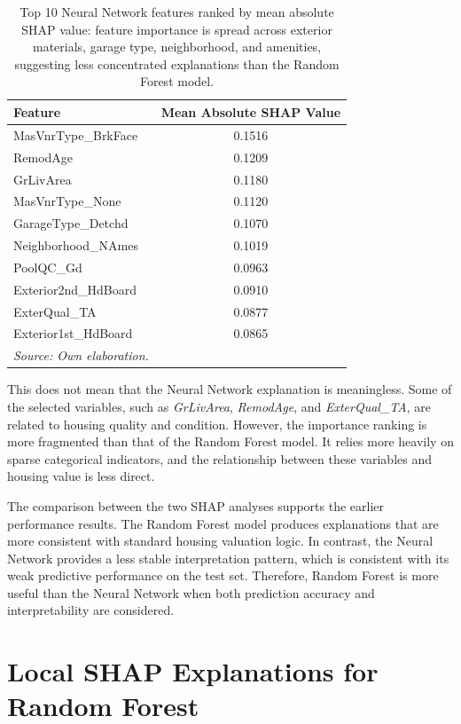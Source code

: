 \documentclass[12pt,a4paper,oneside,openany]{book}
\begin{document}
\begin{table}[H]
\centering
\caption[Top 10 Neural Network features ranked by mean absolute SHAP value]
{Top 10 Neural Network features ranked by mean absolute SHAP value: feature importance is spread across exterior materials, garage type, neighborhood, and amenities, suggesting less concentrated explanations than the Random Forest model.}
\label{tab:shap_importance_nn}
\begin{tabular}{lc}
\toprule
Feature & Mean Absolute SHAP Value \\
\midrule
MasVnrType\_BrkFace & 0.1516 \\
RemodAge & 0.1209 \\
GrLivArea & 0.1180 \\
MasVnrType\_None & 0.1120 \\
GarageType\_Detchd & 0.1070 \\
Neighborhood\_NAmes & 0.1019 \\
PoolQC\_Gd & 0.0963 \\
Exterior2nd\_HdBoard & 0.0910 \\
ExterQual\_TA & 0.0877 \\
Exterior1st\_HdBoard & 0.0865 \\
\bottomrule
\textit{Source: Own elaboration.}
\end{tabular}
\end{table}

This does not mean that the Neural Network explanation is meaningless. Some of the selected variables, such as \textit{GrLivArea}, \textit{RemodAge}, and \textit{ExterQual\_TA}, are related to housing quality and condition. However, the importance ranking is more fragmented than that of the Random Forest model. It relies more heavily on sparse categorical indicators, and the relationship between these variables and housing value is less direct.

The comparison between the two SHAP analyses supports the earlier performance results. The Random Forest model produces explanations that are more consistent with standard housing valuation logic. In contrast, the Neural Network provides a less stable interpretation pattern, which is consistent with its weak predictive performance on the test set. Therefore, Random Forest is more useful than the Neural Network when both prediction accuracy and interpretability are considered.


\section{Local SHAP Explanations for Random Forest}
\end{document}
